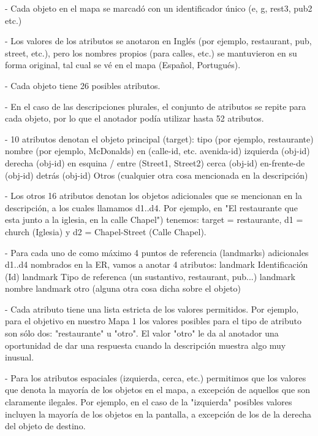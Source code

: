 - Cada objeto en el mapa se marcad\'o con un identificador \'unico (e, g, rest3, pub2 etc.)

- Los valores de los atributos se anotaron en Ingl\'es (por ejemplo, restaurant, pub, street, etc.), pero los nombres propios (para calles, etc.) se mantuvieron en su forma original, tal cual se v\'e en el mapa (Espa\~{n}ol, Portugu\'es).

- Cada objeto tiene 26 posibles atributos.

- En el caso de las descripciones plurales, el conjunto de atributos se repite para cada objeto, por lo que el anotador pod\'{i}a utilizar hasta 52 atributos.

- 10 atributos denotan el objeto principal (target):
  tipo (por ejemplo, restaurante)
  nombre (por ejemplo, McDonalds)
  en (calle-id, etc. avenida-id)
  izquierda (obj-id)
  derecha (obj-id)
  en esquina / entre (Street1, Street2)
  cerca (obj-id)
  en-frente-de (obj-id)
  detr\'as (obj-id)
  Otros (cualquier otra cosa mencionada en la descripci\'on)

- Los otros 16 atributos denotan los objetos adicionales que se mencionan en la descripci\'on, a los cuales llamamos d1..d4. Por ejemplo, en "El restaurante que esta junto a la iglesia, en la calle Chapel") tenemos: target = restaurante, d1 = church (Iglesia) y d2 = Chapel-Street (Calle Chapel).

- Para cada uno de como m\'aximo 4 puntos de referencia (landmarks) adicionales d1..d4 nombrados en la ER, vamos a anotar 4 atributos:
  landmark Identificaci\'on (Id)
  landmark Tipo de referenca (un sustantivo, restaurant, pub...)
  landmark nombre
  landmark otro (alguna otra cosa dicha sobre el objeto)

- Cada atributo tiene una lista estricta de los valores permitidos. Por ejemplo, para el objetivo en nuestro Mapa 1 los valores posibles para el tipo de atributo son s\'olo dos: "restaurante" u "otro". El valor "otro" le da al anotador una oportunidad de dar una respuesta cuando la descripci\'on muestra algo muy inusual.


- Para los atributos espaciales (izquierda, cerca, etc.) permitimos que los valores que denota la mayor\'{i}a de los objetos en el mapa, a excepci\'on de aquellos que son claramente ilegales. Por ejemplo, en el caso de la "izquierda" posibles valores incluyen la mayor\'{i}a de los objetos en la pantalla, a excepci\'on de los de la derecha del objeto de destino.
%

